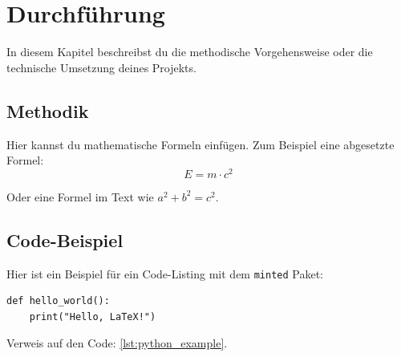 
\chapter{Durchführung}
\label{ch:durchfuehrung}

In diesem Kapitel beschreibst du die methodische Vorgehensweise oder die technische Umsetzung deines Projekts.

\section{Methodik}
Hier kannst du mathematische Formeln einfügen. Zum Beispiel eine abgesetzte Formel:
\begin{equation}
    E = m \cdot c^2
    \label{eq:einstein}
\end{equation}

Oder eine Formel im Text wie $a^2 + b^2 = c^2$.

\section{Code-Beispiel}
Hier ist ein Beispiel für ein Code-Listing mit dem \texttt{minted} Paket:

\begin{listing}[htbp]
\begin{verbatim}
def hello_world():
    print("Hello, LaTeX!")
\end{verbatim}
\caption{Ein einfaches Python-Beispiel.}
\label{lst:python_example}
\end{listing}

Verweis auf den Code: \cref{lst:python_example}.
